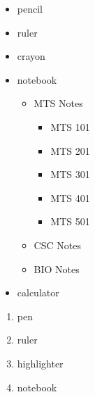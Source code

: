 \documentclass[11pt]{article}
\begin{document}
\vspace{1cm}

\begin{itemize}
\item pencil
\item ruler
\item crayon
\item notebook
	\begin{itemize}
	\item MTS Notes
		\begin{itemize}
		\item MTS 101
		\item MTS 201
		\item MTS 301
		\item MTS 401
		\item MTS 501
		\end{itemize}
	\item CSC Notes
	\item BIO Notes
	\end{itemize}
\item calculator\\

\end{itemize}

\vspace{1cm}


\begin{enumerate}

\item[] pen
\item[] ruler
\item[] highlighter
\item[] notebook

\end{enumerate}
\end{document}
